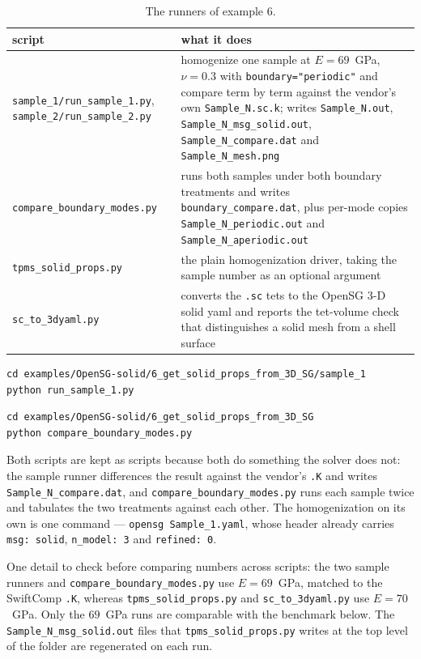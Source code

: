 \begin{table}[htbp]
\centering
\footnotesize
\begin{tabular}{p{4.4cm}p{9.4cm}}
\toprule
script & what it does \\
\midrule
\texttt{sample\_1/run\_sample\_1.py}, \texttt{sample\_2/run\_sample\_2.py} &
  homogenize one sample at $E = 69$~GPa, $\nu = 0.3$ with
  \texttt{boundary="periodic"} and compare term by term against the vendor's own
  \texttt{Sample\_N.sc.k}; writes \texttt{Sample\_N.out},
  \texttt{Sample\_N\_msg\_solid.out}, \texttt{Sample\_N\_compare.dat} and
  \texttt{Sample\_N\_mesh.png} \\
\texttt{compare\_boundary\_modes.py} & runs both samples under both boundary
  treatments and writes \texttt{boundary\_compare.dat}, plus per-mode copies
  \texttt{Sample\_N\_periodic.out} and \texttt{Sample\_N\_aperiodic.out} \\
\texttt{tpms\_solid\_props.py} & the plain homogenization driver, taking the
  sample number as an optional argument \\
\texttt{sc\_to\_3dyaml.py} & converts the \texttt{.sc} tets to the OpenSG 3-D
  solid yaml and reports the tet-volume check that distinguishes a solid mesh
  from a shell surface \\
\bottomrule
\end{tabular}
\caption{The runners of example 6.}
\label{tab:solid-ex6runners}
\end{table}

\begin{lstlisting}[style=shellst]
cd examples/OpenSG-solid/6_get_solid_props_from_3D_SG/sample_1
python run_sample_1.py
\end{lstlisting}

\begin{lstlisting}[style=shellst]
cd examples/OpenSG-solid/6_get_solid_props_from_3D_SG
python compare_boundary_modes.py
\end{lstlisting}

Both scripts are kept as scripts because both do something the solver does not:
the sample runner differences the result against the vendor's \texttt{.K} and
writes \texttt{Sample\_N\_compare.dat}, and
\texttt{compare\_boundary\_modes.py} runs each sample twice and tabulates the
two treatments against each other. The homogenization on its own is one
command --- \texttt{opensg Sample\_1.yaml}, whose header already carries
\texttt{msg: solid}, \texttt{n\_model: 3} and \texttt{refined: 0}.

One detail to check before comparing numbers across scripts: the two sample
runners and \texttt{compare\_boundary\_modes.py} use $E = 69$~GPa, matched to
the SwiftComp \texttt{.K}, whereas \texttt{tpms\_solid\_props.py} and
\texttt{sc\_to\_3dyaml.py} use $E = 70$~GPa. Only the $69$~GPa runs are
comparable with the benchmark below. The \texttt{Sample\_N\_msg\_solid.out}
files that \texttt{tpms\_solid\_props.py} writes at the top level of the folder
are regenerated on each run.

